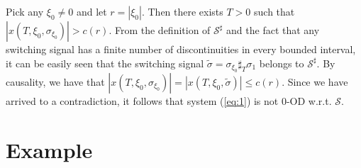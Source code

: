 \documentclass[9pt,final,journal]{IEEEtran}
\def\S{\mathcal{S}}
\begin{document}
\begin{IEEEproof}
Pick any $\xi_0\neq0$ and let $r=|\xi_0|$. Then there exists $T>0$ such that $|x(T,\xi_0,\sigma_{\xi_0})|>c(r)$. From the definition of $\S^{\sharp}$ and the fact that any switching signal has a finite number of discontinuities in every bounded interval, it can be easily seen that the switching signal $\tilde \sigma=\sigma_{\xi_0}\sharp_T \sigma_1$ belongs to $\S^{\sharp}$. By causality, we have that $|x(T,\xi_0,\sigma_{\xi_0})|=|x(T,\xi_0,\tilde \sigma)|\le c(r)$. Since we have arrived to a contradiction, it follows that system (\ref{eq:1}) is not 0-OD w.r.t. $\S$. 
\end{IEEEproof}
\section{Example}
\label{sec:examples}
\end{document}
